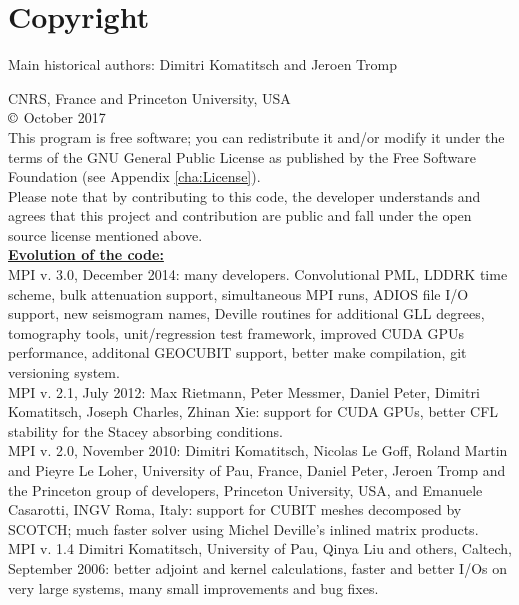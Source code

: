 
\chapter*{Copyright}

Main historical authors: Dimitri Komatitsch and Jeroen Tromp

CNRS, France and Princeton University, USA\\
$\copyright$ October 2017\\

\noindent
This program is free software; you can redistribute it and/or modify
it under the terms of the GNU General Public License as published
by the Free Software Foundation (see Appendix \ref{cha:License}).\\

\noindent
Please note that by contributing to this code, the developer understands and agrees that this project and contribution
are public and fall under the open source license mentioned above.\\

\noindent
\textbf{\underline{Evolution of the code:}}\\

MPI v. 3.0, December 2014: many developers.
Convolutional PML, LDDRK time scheme, bulk attenuation support, simultaneous MPI runs,
ADIOS file I/O support, new seismogram names,
Deville routines for additional GLL degrees, tomography tools, unit/regression test framework,
improved CUDA GPUs performance, additonal GEOCUBIT support, better make compilation,
git versioning system. \\


MPI v. 2.1, July 2012: Max Rietmann, Peter Messmer, Daniel Peter, Dimitri
Komatitsch, Joseph Charles, Zhinan Xie: support for CUDA GPUs, better
CFL stability for the Stacey absorbing conditions. \\


MPI v. 2.0, November 2010: Dimitri Komatitsch, Nicolas Le Goff, Roland
Martin and Pieyre Le Loher, University of Pau, France, Daniel Peter,
Jeroen Tromp and the Princeton group of developers, Princeton University,
USA, and Emanuele Casarotti, INGV Roma, Italy: support for CUBIT meshes
decomposed by SCOTCH; much faster solver using Michel Deville's inlined
matrix products.\\


MPI v. 1.4 Dimitri Komatitsch, University of Pau, Qinya Liu and others,
Caltech, September 2006: better adjoint and kernel calculations, faster
and better I/Os on very large systems, many small improvements and
bug fixes.\\


